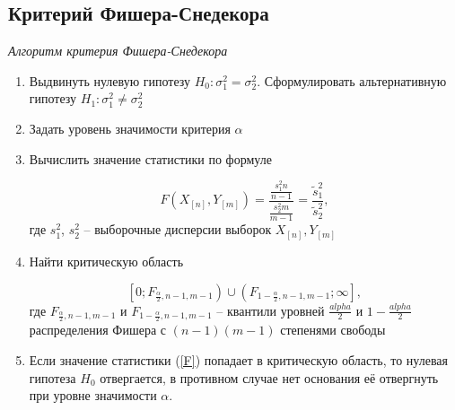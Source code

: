\subsection{Критерий Фишера-Снедекора}

\textit{Алгоритм критерия Фишера-Снедекора}

\begin{enumerate}
	\item Выдвинуть нулевую гипотезу $H_0: \sigma^2_1 = \sigma^2_2$. Сформулировать альтернативную гипотезу $H_1: \sigma^2_1 \ne \sigma^2_2$
	\item Задать уровень значимости критерия $\alpha$
	\item Вычислить значение статистики по формуле
	
	\begin{equation}\label{F}
		F(X_{[n]}, Y_{[m]}) = \frac{\frac{s^2_1n}{n - 1}}{\frac{s^2_2m}{m - 1}} = \frac{\tilde{s}^2_1}{\tilde{s}^2_2},
	\end{equation}
	где $s^2_1$, $s^2_2$ -- выборочные дисперсии выборок $X_{[n]}, Y_{[m]}$
	
	\item Найти критическую область 
	
	\begin{equation}
		\left[0; F_{\frac{\alpha}{2}, n - 1, m - 1} \right) \cup \left( F_{1 - \frac{\alpha}{2}, n - 1, m - 1}; \infty \right],
	\end{equation}
	где $F_{\frac{\alpha}{2}, n - 1, m - 1}$ и $F_{1 - \frac{\alpha}{2}, n - 1, m - 1}$ -- квантили уровней $\frac{alpha}{2}$ и $1 - \frac{alpha}{2}$ распределения Фишера с $(n - 1)(m - 1)$ степенями свободы
	
	\item Если значение статистики (\ref{F}) попадает в критическую область, то нулевая гипотеза $H_0$ отвергается, в противном случае нет основания её отвергнуть при уровне значимости $\alpha$.
\end{enumerate}
